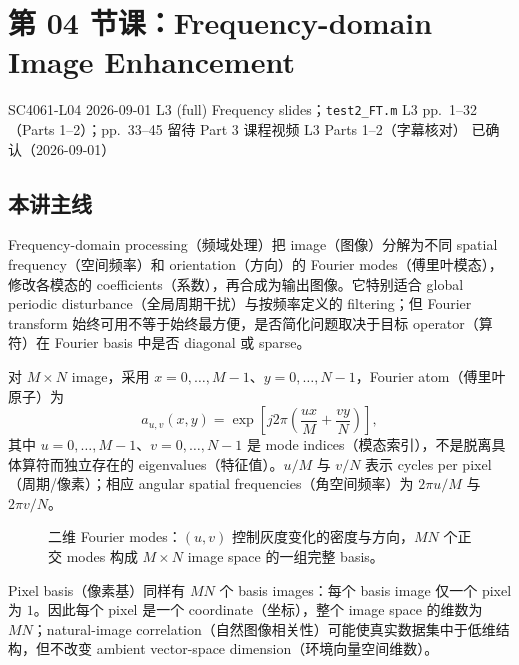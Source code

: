 
\section{第 04 节课：Frequency-domain Image Enhancement}
\label{lecture:SC4061-L04}

\lecturemeta
  {SC4061-L04}
  {2026-09-01}
  {L3 (full) Frequency slides；\texttt{test2\_FT.m}}
  {L3 pp.~1--32（Parts 1--2）；pp.~33--45 留待 Part 3}
  {课程视频 L3 Parts 1--2（字幕核对）}
  {已确认（2026-09-01）}

\subsection{本讲主线}

Frequency-domain processing（频域处理）把 image（图像）分解为不同 spatial frequency（空间频率）和 orientation（方向）的 Fourier modes（傅里叶模态），修改各模态的 coefficients（系数），再合成为输出图像。它特别适合 global periodic disturbance（全局周期干扰）与按频率定义的 filtering；但 Fourier transform 始终可用不等于始终最方便，是否简化问题取决于目标 operator（算符）在 Fourier basis 中是否 diagonal 或 sparse。


对 $M\times N$ image，采用 $x=0,\ldots,M-1$、$y=0,\ldots,N-1$，Fourier atom（傅里叶原子）为
\[
  \boxed{a_{u,v}(x,y)=
  \exp\!\left[j2\pi\left(\frac{ux}{M}+\frac{vy}{N}\right)\right]},
\]
其中 $u=0,\ldots,M-1$、$v=0,\ldots,N-1$ 是 mode indices（模态索引），不是脱离具体算符而独立存在的 eigenvalues（特征值）。$u/M$ 与 $v/N$ 表示 cycles per pixel（周期/像素）；相应 angular spatial frequencies（角空间频率）为 $2\pi u/M$ 与 $2\pi v/N$。

\begin{figure}[htbp]
  \centering
  \resizebox{0.94\textwidth}{!}{}
  \caption{二维 Fourier modes：$(u,v)$ 控制灰度变化的密度与方向，$MN$ 个正交 modes 构成 $M\times N$ image space 的一组完整 basis。}
  \label{fig:sc4061-l04-fourier-modes}
\end{figure}

Pixel basis（像素基）同样有 $MN$ 个 basis images：每个 basis image 仅一个 pixel 为 $1$。因此每个 pixel 是一个 coordinate（坐标），整个 image space 的维数为 $MN$；natural-image correlation（自然图像相关性）可能使真实数据集中于低维结构，但不改变 ambient vector-space dimension（环境向量空间维数）。

